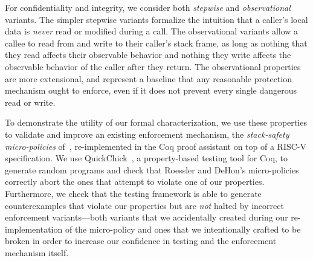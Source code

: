 \documentclass[acmsmall,review,anonymous]{acmart}\settopmatter{printfolios=true,printccs=false,printacmref=false}
\begin{document}
For confidentiality and integrity, we consider both {\em stepwise}
and {\em observational} variants.  The simpler stepwise
variants formalize the intuition that a caller's local data is {\em never}
read or modified during a call. The observational variants
allow a callee to read from and write to their caller's stack frame, as
long as nothing that they read affects their observable behavior and nothing
they write affects the observable behavior of the caller after they return.
The observational properties are more extensional, and represent a baseline
that any reasonable protection mechanism ought to enforce,
even if it does not prevent every single dangerous read or write.

To demonstrate the utility of our formal characterization, we use these
properties to validate and improve an existing enforcement mechanism, the
{\em stack-safety micro-policies} of~\citet{DBLP:conf/sp/RoesslerD18}, re-implemented
in the Coq proof assistant on top of a RISC-V specification.  We
use QuickChick~\citep{Denes:VSL2014,Pierce:SF4}, a property-based testing
tool for Coq, to generate random programs and check
that Roessler and DeHon's micro-policies correctly abort the ones that
attempt to violate one of our properties. Furthermore, we
%
check that the testing framework is able to generate counterexamples
that violate our properties but are \emph{not} halted by incorrect
enforcement variants---both variants that we accidentally created
during our re-implementation of the micro-policy and ones that we
intentionally crafted to be broken in order to increase our confidence
in testing and the enforcement mechanism itself.
\end{document}
